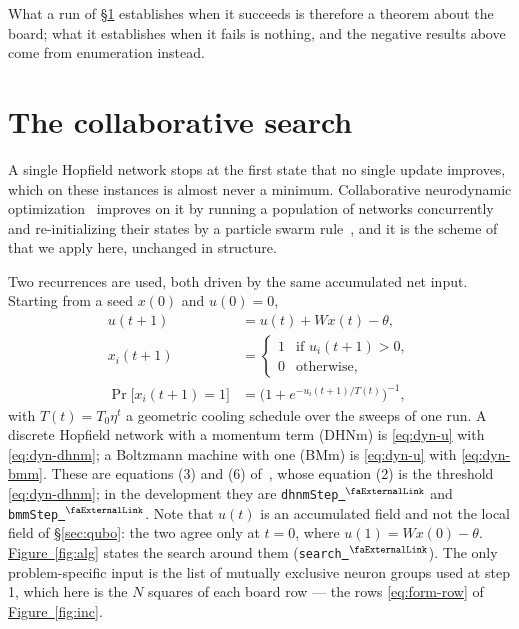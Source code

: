 \documentclass{easychair}
\newcommand{\secref}[1]{\hyperref[#1]{\textcolor{academicpurple}{\S\ref*{#1}}}}
\newcommand{\citeref}[1]{\textcolor{academicpurple}{\cite{#1}}}
\newcommand{\figref}[1]{\textcolor{academicpurple}{\hyperref[#1]{Figure~\ref*{#1}}}}
\newcommand{\extlink}{~\ensuremath{{}^\text{\faExternalLink}}}
\newcommand{\repoowner}{mkaratarakis/HNBM}
\newcommand{\reporef}{1bd91612ee31180f6c99fa11090b713f3012ead4}
\newcommand{\repo}{https://github.com/\repoowner/blob/\reporef}
\newcommand{\srcl}[2]{\href{\repo/#1\#L#2}{\extlink}}
\newcommand{\qusrc}[2]{\srcl{HopfieldNet/QUBO/#1}{#2}}
\begin{document}
What a run of \secref{sec:search} establishes when it succeeds is therefore a theorem about the
board; what it establishes when it fails is nothing, and the negative results above come from
enumeration instead.


\section{The collaborative search}\label{sec:search}

A single Hopfield network stops at the first state that no single update improves, which on these
instances is almost never a minimum. Collaborative neurodynamic
optimization~\citeref{che2019} improves on it by running a population of networks concurrently and
re-initializing their states by a particle swarm rule~\citeref{kennedy1995}, and it is the
scheme of~\citeref{liwang2022} that we apply here, unchanged in structure.

Two recurrences are used, both driven by the same accumulated net input. Starting from a seed
$x(0)$ and $u(0) = 0$,
\begin{subequations}\label{eq:dyn}
\begin{align}
  u(t+1) &= u(t) + Wx(t) - \theta, \label{eq:dyn-u}\\
  x_i(t+1) &= \begin{cases} 1 & \text{if } u_i(t+1) > 0,\\ 0 & \text{otherwise,}\end{cases}
    \label{eq:dyn-dhnm}\\
  \Pr\bigl[x_i(t+1) = 1\bigr] &= \bigl(1 + e^{-u_i(t+1)/T(t)}\bigr)^{-1}, \label{eq:dyn-bmm}
\end{align}
\end{subequations}
with $T(t) = T_0\eta^{t}$ a geometric cooling schedule over the sweeps of one run. A discrete
Hopfield network with a momentum term (DHNm) is \eqref{eq:dyn-u} with \eqref{eq:dyn-dhnm}; a
Boltzmann machine with one (BMm) is \eqref{eq:dyn-u} with \eqref{eq:dyn-bmm}. These are equations
(3) and (6) of~\citeref{liwang2022}, whose equation (2) is the threshold \eqref{eq:dyn-dhnm}; in the
development they are \lstinline{dhnmStep}\qusrc{Dynamics.lean}{179} and
\lstinline{bmmStep}\qusrc{Dynamics.lean}{213}. Note
that $u(t)$ is an
accumulated field and not the local field of \secref{sec:qubo}: the two agree only at $t = 0$, where
$u(1) = Wx(0) - \theta$. \figref{fig:alg} states the search around them (\lstinline{search}\qusrc{Search.lean}{171}). The only
problem-specific input is the list of mutually exclusive neuron groups used at step 1, which here is
the $N$ squares of each board row --- the rows \eqref{eq:form-row} of \figref{fig:inc}.
\end{document}
